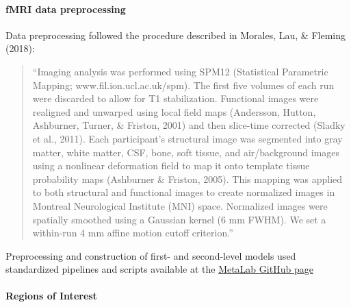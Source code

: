 \documentclass[12pt,twoside]{reedthesis}
\begin{document}
\hypertarget{fmri-data-preprocessing}{%
\paragraph*{fMRI data preprocessing}\label{fmri-data-preprocessing}}

Data preprocessing followed the procedure described in Morales, Lau, \& Fleming (2018):
\begin{quote}
``Imaging analysis was performed using SPM12 (Statistical Parametric Mapping; www.fil.ion.ucl.ac.uk/spm). The first five volumes of each run were discarded to allow for T1 stabilization. Functional images were realigned and unwarped using local field maps (Andersson, Hutton, Ashburner, Turner, \& Friston, 2001) and then slice-time corrected (Sladky et al., 2011). Each participant's structural image was segmented into gray matter, white matter, CSF, bone, soft tissue, and air/background images using a nonlinear deformation field to map it onto template tissue probability maps (Ashburner \& Friston, 2005). This mapping was applied to both structural and functional images to create normalized images in Montreal Neurological Institute (MNI) space. Normalized images were spatially smoothed using a Gaussian kernel (6 mm FWHM). We set a within-run 4 mm affine motion cutoff criterion.''
\end{quote}
Preprocessing and construction of first- and second-level models used standardized pipelines and scripts available at the \href{https://github.com/metacoglab/MetaLabCore/}{MetaLab GitHub page}

\hypertarget{regions-of-interest}{%
\paragraph*{Regions of Interest}\label{regions-of-interest}}
\end{document}
